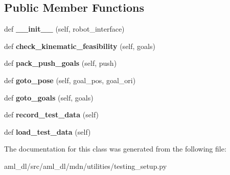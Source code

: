 \subsection*{Public Member Functions}
\begin{DoxyCompactItemize}
\item 
\hypertarget{classsrc_1_1aml__dl_1_1mdn_1_1utilities_1_1testing__setup_1_1_test_setup_a17aa580c18f4e49d767127a8685e7ada}{}\label{classsrc_1_1aml__dl_1_1mdn_1_1utilities_1_1testing__setup_1_1_test_setup_a17aa580c18f4e49d767127a8685e7ada} 
def {\bfseries \+\_\+\+\_\+init\+\_\+\+\_\+} (self, robot\+\_\+interface)
\item 
\hypertarget{classsrc_1_1aml__dl_1_1mdn_1_1utilities_1_1testing__setup_1_1_test_setup_af8158cdc18da5e44ad2de67e486c07d3}{}\label{classsrc_1_1aml__dl_1_1mdn_1_1utilities_1_1testing__setup_1_1_test_setup_af8158cdc18da5e44ad2de67e486c07d3} 
def {\bfseries check\+\_\+kinematic\+\_\+feasibility} (self, goals)
\item 
\hypertarget{classsrc_1_1aml__dl_1_1mdn_1_1utilities_1_1testing__setup_1_1_test_setup_a1afb5067f6d90c74fc6883ed8cf019e7}{}\label{classsrc_1_1aml__dl_1_1mdn_1_1utilities_1_1testing__setup_1_1_test_setup_a1afb5067f6d90c74fc6883ed8cf019e7} 
def {\bfseries pack\+\_\+push\+\_\+goals} (self, push)
\item 
\hypertarget{classsrc_1_1aml__dl_1_1mdn_1_1utilities_1_1testing__setup_1_1_test_setup_a4fe931cd7e1ca0370b073f6cad8f8edd}{}\label{classsrc_1_1aml__dl_1_1mdn_1_1utilities_1_1testing__setup_1_1_test_setup_a4fe931cd7e1ca0370b073f6cad8f8edd} 
def {\bfseries goto\+\_\+pose} (self, goal\+\_\+pos, goal\+\_\+ori)
\item 
\hypertarget{classsrc_1_1aml__dl_1_1mdn_1_1utilities_1_1testing__setup_1_1_test_setup_a16341056fe6805b87388f469cd48325d}{}\label{classsrc_1_1aml__dl_1_1mdn_1_1utilities_1_1testing__setup_1_1_test_setup_a16341056fe6805b87388f469cd48325d} 
def {\bfseries goto\+\_\+goals} (self, goals)
\item 
\hypertarget{classsrc_1_1aml__dl_1_1mdn_1_1utilities_1_1testing__setup_1_1_test_setup_a638c7c9f108788711d28aeca45236c8d}{}\label{classsrc_1_1aml__dl_1_1mdn_1_1utilities_1_1testing__setup_1_1_test_setup_a638c7c9f108788711d28aeca45236c8d} 
def {\bfseries record\+\_\+test\+\_\+data} (self)
\item 
\hypertarget{classsrc_1_1aml__dl_1_1mdn_1_1utilities_1_1testing__setup_1_1_test_setup_a1f3a0c8444615f273b4aa32f058fda69}{}\label{classsrc_1_1aml__dl_1_1mdn_1_1utilities_1_1testing__setup_1_1_test_setup_a1f3a0c8444615f273b4aa32f058fda69} 
def {\bfseries load\+\_\+test\+\_\+data} (self)
\end{DoxyCompactItemize}


The documentation for this class was generated from the following file\+:\begin{DoxyCompactItemize}
\item 
aml\+\_\+dl/src/aml\+\_\+dl/mdn/utilities/testing\+\_\+setup.\+py\end{DoxyCompactItemize}
